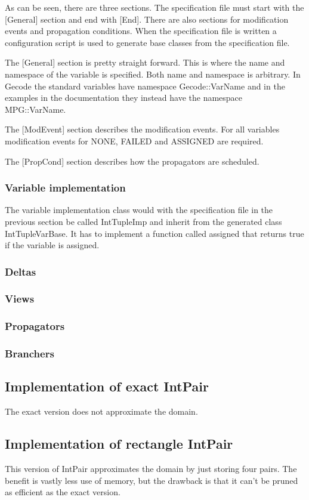 \documentclass[a4paper,11pt]{article}
\begin{document}
As can be seen, there are three sections. The specification file must start with the [General] section and end with [End]. There are also sections for modification events and propagation conditions. When the specification file is written a configuration script is used to generate base classes from the specification file.

The [General] section is pretty straight forward. This is where the name and namespace of the variable is specified. Both name and namespace is arbitrary. In Gecode the standard variables have namespace Gecode::VarName and in the examples in the documentation they instead have the namespace MPG::VarName.

The [ModEvent] section describes the modification events. For all variables modification events for NONE, FAILED and ASSIGNED are required.

The [PropCond] section describes how the propagators are scheduled.

\subsubsection{Variable implementation}
The variable implementation class would with the specification file in the previous section be called IntTupleImp and inherit from the generated class IntTupleVarBase. It has to implement a function called assigned that returns true if the variable is assigned.
\subsubsection{Deltas}
\subsubsection{Views}
\subsubsection{Propagators}
\subsubsection{Branchers}

\subsection{Implementation of exact IntPair}
The exact version does not approximate the domain.
\subsection{Implementation of rectangle IntPair}
This version of IntPair approximates the domain by just storing four pairs. The benefit is vastly less use of memory, but the drawback is that it can't be pruned as efficient as the exact version.
\end{document}
